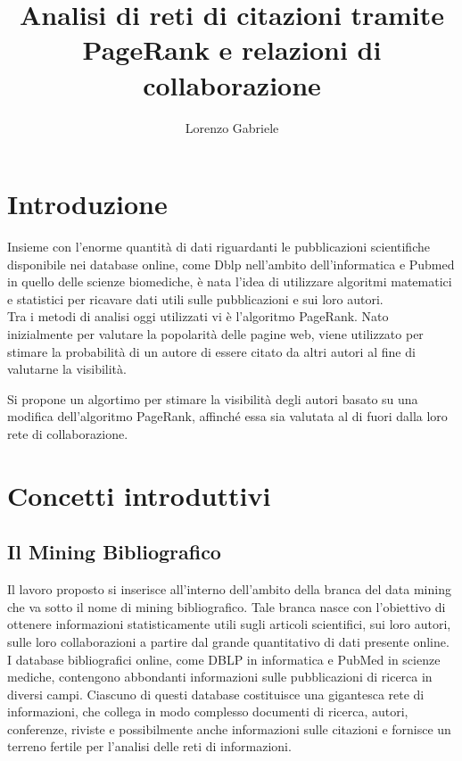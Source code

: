 \documentclass[a4paper, 12pt]{article}
\title{Analisi di reti di citazioni tramite PageRank e relazioni di collaborazione}
\author{Lorenzo Gabriele}
\let\oldsection\section
\renewcommand\section{\clearpage\oldsection}
\begin{document}
\tableofcontents
\clearpage

\section{Introduzione}
Insieme con l'enorme quantità di dati riguardanti le pubblicazioni scientifiche disponibile nei database online, come Dblp nell'ambito dell'informatica e Pubmed in quello delle scienze biomediche, è nata l'idea di utilizzare algoritmi matematici e statistici per ricavare dati utili sulle pubblicazioni e sui loro autori. \\
Tra i metodi di analisi oggi utilizzati vi è l'algoritmo PageRank. Nato inizialmente per valutare la popolarità delle pagine web, viene utilizzato per stimare la probabilità di un autore di essere citato da altri autori al fine di valutarne la visibilità.
\par Si propone un algortimo per stimare la visibilità degli autori basato su una modifica dell'algoritmo PageRank, affinché essa sia valutata al di fuori dalla loro rete di collaborazione.

\section{Concetti introduttivi}
\subsection{Il Mining Bibliografico}
Il lavoro proposto si inserisce all'interno dell'ambito della branca del data mining che va sotto il nome di mining bibliografico. Tale branca nasce con l'obiettivo di ottenere informazioni statisticamente utili sugli articoli scientifici, sui loro autori, sulle loro collaborazioni a partire dal grande quantitativo di dati presente online. \\
I database bibliografici online, come DBLP in informatica e PubMed in scienze mediche, contengono abbondanti informazioni sulle pubblicazioni di ricerca in diversi campi. Ciascuno di questi database costituisce una gigantesca rete di informazioni, che collega in modo complesso documenti di ricerca, autori, conferenze, riviste e possibilmente anche informazioni sulle citazioni e fornisce un terreno fertile per l'analisi delle reti di informazioni.
\end{document}
